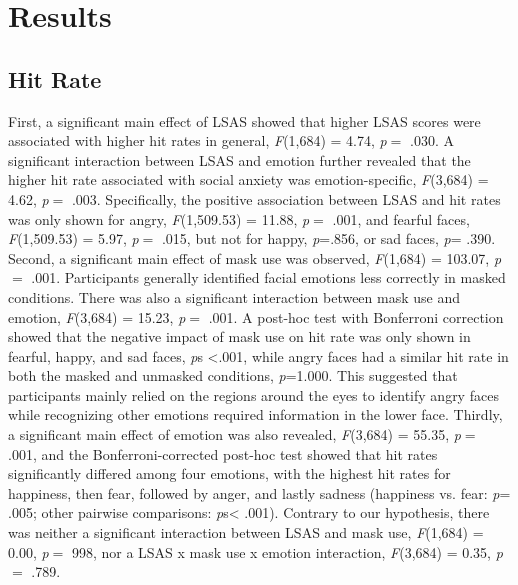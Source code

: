 \section{Results}
\newcommand{\Ftest}[4]
{\textit{F}(#1,#2) = #3, \textit{p}$=$
#4}
\subsection{Hit Rate}
First, a significant main effect of LSAS showed that higher LSAS scores were associated with higher hit rates in general, \Ftest{1}{684}{4.74}{.030}. A significant interaction between LSAS and emotion further revealed that the higher hit rate associated with social anxiety was emotion-specific, \Ftest{3}{684}{4.62}{.003}. Specifically, the positive association between LSAS and hit rates was only shown for angry, \Ftest{1}{509.53}{11.88}{.001}, and fearful faces, \Ftest{1}{509.53}{5.97}{.015}, but not for happy, \textit{p}=.856, or sad faces, \textit{p}= .390. Second, a significant main effect of mask use was observed, \Ftest{1}{684}{103.07}{.001}. Participants generally identified facial emotions less correctly in masked conditions. There was also a significant interaction between mask use and emotion, \Ftest{3}{684}{15.23}{.001}. A post-hoc test with Bonferroni correction showed that the negative impact of mask use on hit rate was only shown in fearful, happy, and sad faces, \textit{p}s <.001, while angry faces had a similar hit rate in both the masked and unmasked conditions, \textit{p}=1.000. This suggested that participants mainly relied on the regions around the eyes to identify angry faces while recognizing other emotions required information in the lower face. Thirdly, a significant main effect of emotion was also revealed, \Ftest{3}{684}{55.35}{.001}, and the Bonferroni-corrected post-hoc test showed that hit rates significantly differed among four emotions, with the highest hit rates for happiness, then fear, followed by anger, and lastly sadness (happiness vs. fear: \textit{p}= .005; other pairwise comparisons: \textit{p}s< .001). Contrary to our hypothesis, there was neither a significant interaction between LSAS and mask use, \Ftest{1}{684}{0.00}{998}, nor a LSAS x mask use x emotion interaction, \Ftest{3} {684}{0.35}{.789}.
